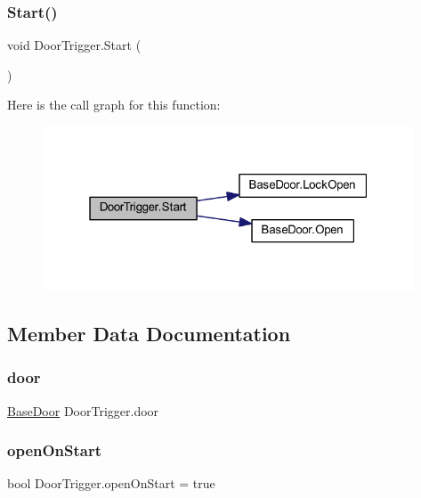 \subsubsection{\texorpdfstring{Start()}{Start()}}
{\footnotesize\ttfamily void Door\+Trigger.\+Start (\begin{DoxyParamCaption}{ }\end{DoxyParamCaption})\hspace{0.3cm}{\ttfamily [private]}}

Here is the call graph for this function\+:
\nopagebreak
\begin{figure}[H]
\begin{center}
\leavevmode
\includegraphics[width=313pt]{class_door_trigger_a3b079888a26feb3139b6a0507b89c65c_cgraph}
\end{center}
\end{figure}


\subsection{Member Data Documentation}
\mbox{\label{class_door_trigger_a592b30ac7c1c4b719d6a90fa96fbb046}} 
\subsubsection{\texorpdfstring{door}{door}}
{\footnotesize\ttfamily \mbox{\hyperlink{class_base_door}{Base\+Door}} Door\+Trigger.\+door\hspace{0.3cm}{\ttfamily [private]}}

\mbox{\label{class_door_trigger_ac3f14399b44bff7efd22f9ce4d4ef5c6}} 
\subsubsection{\texorpdfstring{open\+On\+Start}{openOnStart}}
{\footnotesize\ttfamily bool Door\+Trigger.\+open\+On\+Start = true\hspace{0.3cm}{\ttfamily [private]}}



